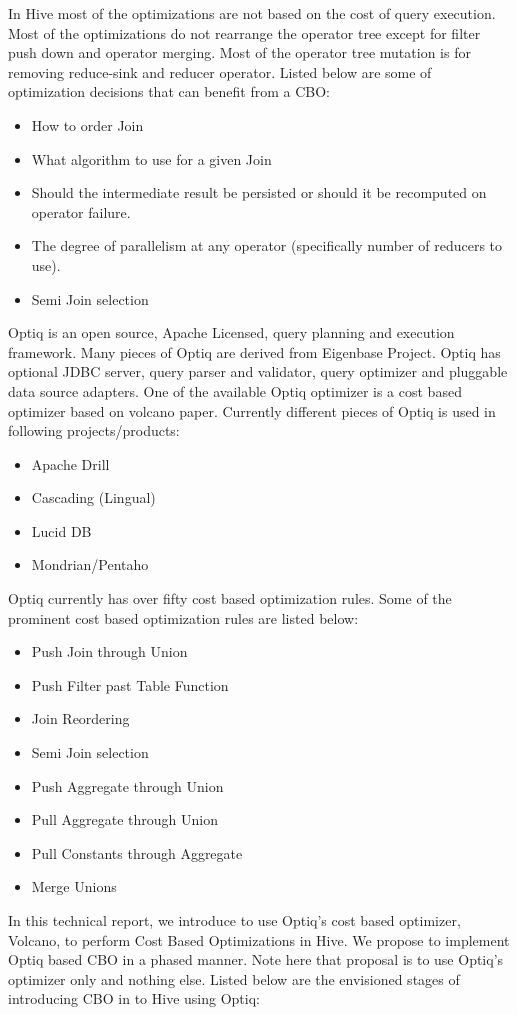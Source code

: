 \documentclass{vldb}
\newcommand{\bi}{\begin{itemize}}
\newcommand{\ei}{\end{itemize}}
\newcommand{\ii}{\item}
\begin{document}
In Hive most of the optimizations are not based on the cost of query execution. Most of the optimizations do not rearrange the operator tree except for filter push down and operator merging. 
Most of the operator tree mutation is for removing reduce-sink and reducer operator. Listed below are some of optimization decisions that can benefit from a CBO:

\bi
\ii How to order Join
\ii What algorithm to use for a given Join
\ii Should the intermediate result be persisted or should it be recomputed on operator failure.
\ii The degree of parallelism at any operator (specifically number of reducers to use).
\ii Semi Join selection
\ei

Optiq is an open source, Apache Licensed, query planning and execution framework. 
Many pieces of Optiq are derived from Eigenbase Project. 
Optiq has optional JDBC server, query parser and validator, query optimizer and pluggable data source adapters. 
One of the available Optiq optimizer is a cost based optimizer based on volcano paper. 
Currently different pieces of Optiq is used in following projects/products:

\bi
\ii Apache Drill
\ii Cascading (Lingual)
\ii Lucid DB
\ii Mondrian/Pentaho
\ei


Optiq currently has over fifty cost based optimization rules. Some of the prominent cost based optimization rules are listed below:

\bi
\ii Push Join through Union
\ii Push Filter past Table Function
\ii Join Reordering
\ii Semi Join selection
\ii Push Aggregate through Union
\ii Pull Aggregate through Union
\ii Pull Constants through Aggregate
\ii Merge Unions
\ei

In this technical report, we introduce to use Optiq’s cost based optimizer, Volcano, to perform Cost Based Optimizations in Hive.
 We propose to implement Optiq based CBO in a phased manner. 
Note here that proposal is to use Optiq’s optimizer only and nothing else. 
Listed below are the envisioned stages of introducing CBO in to Hive using Optiq:
\end{document}
